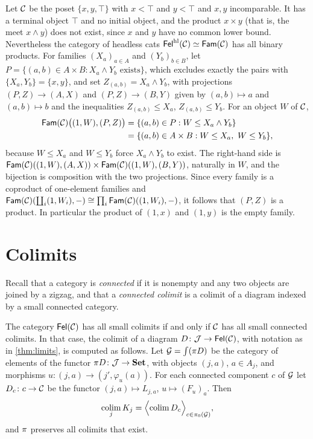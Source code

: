 \begin{counterexample}\label{cex:headless-products}
Let $\mathcal{C}$ be the poset $\{x,y,\top\}$ with $x<\top$ and $y<\top$ and $x,y$
incomparable. It has a terminal object $\top$ and no initial object, and the
product $x\times y$ (that is, the meet $x\wedge y$) does not exist, since $x$
and $y$ have no common lower bound. Nevertheless the category of headless
cats $\mathsf{Fel}^{\mathrm{hl}}(\mathcal{C})\simeq\mathsf{Fam}(\mathcal{C})$ has all binary products. For families
$(X_a)_{a\in A}$ and $(Y_b)_{b\in B}$, let
$P=\{(a,b)\in A\times B: X_a\wedge Y_b\text{ exists}\}$, which excludes exactly
the pairs with $\{X_a,Y_b\}=\{x,y\}$, and set $Z_{(a,b)}=X_a\wedge Y_b$, with
projections $(P,Z)\to(A,X)$ and $(P,Z)\to(B,Y)$ given by $(a,b)\mapsto a$ and
$(a,b)\mapsto b$ and the inequalities $Z_{(a,b)}\le X_a$, $Z_{(a,b)}\le Y_b$. For an
object $W$ of $\mathcal{C}$,
\begin{align*}
\mathsf{Fam}(\mathcal{C})\bigl((1,W),(P,Z)\bigr)&=\{(a,b)\in P:W\le X_a\wedge Y_b\}\\
&=\{(a,b)\in A\times B: W\le X_a,\ W\le Y_b\},
\end{align*}
because $W\le X_a$ and $W\le Y_b$ force $X_a\wedge Y_b$ to exist. The right-hand
side is $\mathsf{Fam}(\mathcal{C})((1,W),(A,X))\times\mathsf{Fam}(\mathcal{C})((1,W),(B,Y))$, naturally in $W$,
and the bijection is composition with the two projections.
Since every family is a coproduct of one-element families and
$\mathsf{Fam}(\mathcal{C})(\coprod_i(1,W_i),-)\cong\prod_i\mathsf{Fam}(\mathcal{C})((1,W_i),-)$, it follows that
$(P,Z)$ is a product. In particular the product of $(1,x)$ and $(1,y)$ is the
empty family.
\end{counterexample}

\section{Colimits}\label{sec:colimits}

Recall that a category is \emph{connected} if it is nonempty and any two
objects are joined by a zigzag, and that a \emph{connected colimit} is a
colimit of a diagram indexed by a small connected category.

\begin{theorem}\label{thm:colimits}
The category $\mathsf{Fel}(\mathcal{C})$ has all small colimits if and only if $\mathcal{C}$ has all
small connected colimits. In that case, the colimit of a diagram
$D\colon\mathcal{J}\to\mathsf{Fel}(\mathcal{C})$, with notation as in \cref{thm:limits}, is computed
as follows. Let $\mathcal{G}=\textstyle\int(\pi D)$ be the category of elements of the functor
$\pi D\colon\mathcal{J}\to\mathbf{Set}$, with objects $(j,a)$, $a\in A_j$, and morphisms
$u\colon(j,a)\to(j',\varphi_u(a))$. For each connected component $c$ of $\mathcal{G}$
let $D_c\colon c\to\mathcal{C}$ be the functor $(j,a)\mapsto L_{j,a}$,
$u\mapsto(F_u)_a$. Then
\[
\operatorname*{colim}_jK_j=\Bigl\langle\operatorname*{colim} D_c\Bigr\rangle_{c\in\pi_0(\mathcal{G})},
\]
and $\pi$ preserves all colimits that exist.
\end{theorem}

